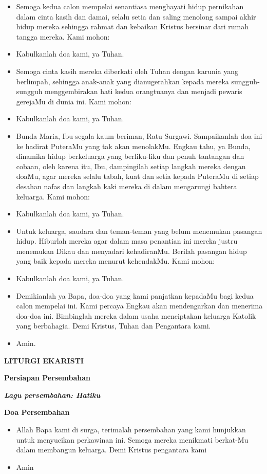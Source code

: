 \documentclass[12pt]{book}
\makeatletter
\newcommand{\judul}[1]{%
  {\parindent \z@ \centering \normalfont
    \interlinepenalty\@M \Large \bfseries #1\par\nobreak \vskip 20\p@ }}
\newcommand{\subjudul}[1]{%
  {\parindent \z@ \normalfont
    \interlinepenalty\@M \bfseries #1\par\nobreak \vskip 20\p@ }}
\newcommand{\lagu}[1]{%
  {\parindent \z@ \normalfont
    \interlinepenalty\@M \bfseries \emph{#1}\par\nobreak \vskip 20\p@ }}
\newcommand{\BU}[1]{\begin{itemize} \item[U:] #1 \end{itemize}}
\newcommand{\BI}[1]{\begin{itemize} \item[I:] #1 \end{itemize}}
\newcommand{\BP}[1]{\begin{itemize} \item[P:] #1 \end{itemize}}
\newcommand{\lagupersembahan}{Hatiku }
\makeatother
\begin{document}
\BP{Semoga kedua calon mempelai
senantiasa menghayati hidup pernikahan dalam cinta kasih dan damai, selalu
setia dan saling menolong sampai akhir hidup mereka sehingga rahmat dan
kebaikan Kristus bersinar dari rumah tangga mereka. Kami mohon:}

\BU{Kabulkanlah doa kami, ya Tuhan.}

\BP{Semoga cinta kasih mereka
diberkati oleh Tuhan dengan karunia yang berlimpah, sehingga anak-anak yang dianugerahkan
kepada mereka sungguh-sungguh menggembirakan hati kedua orangtuanya dan menjadi
pewaris gerejaMu di dunia ini. Kami mohon:}

\BU{Kabulkanlah doa kami, ya Tuhan.}

\BP{Bunda Maria, Ibu segala kaum beriman, Ratu Surgawi. Sampaikanlah doa ini ke hadirat PuteraMu yang tak akan menolakMu. Engkau tahu, ya Bunda, dinamika hidup berkeluarga yang berliku-liku dan penuh tantangan dan cobaan, oleh karena itu, Ibu, dampingilah setiap langkah mereka dengan doaMu, agar mereka selalu tabah, kuat dan setia kepada PuteraMu di setiap desahan nafas dan langkah kaki mereka di dalam mengarungi bahtera keluarga. Kami mohon:}

\BU{Kabulkanlah doa kami, ya Tuhan.}

\BP{Untuk keluarga, saudara dan teman-teman yang belum menemukan pasangan
hidup. Hiburlah mereka agar dalam masa penantian ini mereka justru menemukan
Dikau dan menyadari kehadiranMu. Berilah pasangan hidup yang baik kepada mereka
menurut kehendakMu. Kami mohon:}

\BU{Kabulkanlah doa kami, ya Tuhan.}

\BI{Demikianlah ya Bapa, doa-doa
yang kami panjatkan kepadaMu bagi kedua calon mempelai ini. Kami percaya Engkau akan
mendengarkan dan menerima doa-doa ini. Bimbinglah mereka dalam usaha
menciptakan keluarga Katolik yang berbahagia. Demi Kristus, Tuhan dan
Pengantara kami.}

\BU{Amin.}

\judul{LITURGI EKARISTI}

\subjudul{Persiapan Persembahan}

\lagu{Lagu persembahan: \lagupersembahan}

\subjudul{Doa Persembahan}

\BI{Allah Bapa kami di surga, terimalah persembahan yang kami hunjukkan untuk menyucikan perkawinan ini. Semoga mereka menikmati berkat-Mu dalam membangun keluarga. Demi Kristus pengantara kami}

\BU{Amin}
\end{document}
